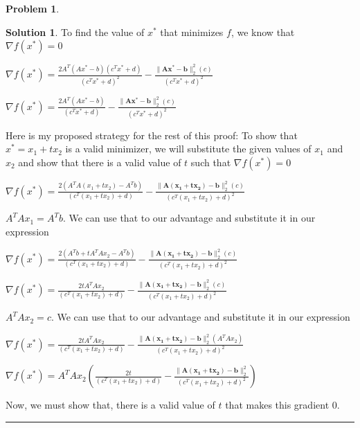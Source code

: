 \documentclass{article}
\theoremstyle{definition}
\newtheorem{problem}{Problem}
\def\fline{\rule{0.75\linewidth}{0.5pt}}
\newcommand{\finishline}{\begin{center}\fline\end{center}}
\newtheorem*{solution*}{Solution}
\newenvironment{solution}{\begin{solution*}}{{\finishline} \end{solution*}}
\begin{document}
\begin{problem}
\begin{enumerate}
    \begin{solution}
    To find the value of $x^*$ that minimizes $f$, we know that $\nabla f(x^*) = 0$ \newline 

        $\nabla f(x^*) = \frac{2A^T (Ax^* - b)(c^Tx^* + d)}{(c^Tx^* + d) ^ 2} - \frac{\|\mathbf{Ax^* - b}\|^2_2 (c)}{(c^Tx^* + d) ^ 2}$ \newline 

        $\nabla f(x^*) = \frac{2A^T (Ax^* - b)}{(c^Tx^* + d)} - \frac{\|\mathbf{Ax^* - b}\|^2_2 (c)}{(c^Tx^* + d) ^ 2}$ \newline 


        Here is my proposed strategy for the rest of this proof: \newline 
        To show that $x^* = x_1 + tx_2$ is a valid minimizer, we will substitute the given values of $x_1$ and $x_2$ and show that there is a valid value of $t$ such that $\nabla f(x^*) = 0$ \newline 

        $\nabla f(x^*) = \frac{2(A^TA(x_1 + tx_2) - A^Tb)}{(c^T(x_1 + tx_2) + d)} - \frac{\|\mathbf{A(x_1 + tx_2) - b}\|^2_2 (c)}{(c^T(x_1 + tx_2) + d) ^ 2}$ \newline 

        $A^TAx_1 = A^Tb$. We can use that to our advantage and substitute it in our expression

        $\nabla f(x^*) = \frac{2(A^Tb + tA^TAx_2 - A^Tb)}{(c^T(x_1 + tx_2) + d)} - \frac{\|\mathbf{A(x_1 + tx_2) - b}\|^2_2 (c)}{(c^T(x_1 + tx_2) + d) ^ 2}$ \newline 

        $\nabla f(x^*) = \frac{2tA^TAx_2}{(c^T(x_1 + tx_2) + d)} - \frac{\|\mathbf{A(x_1 + tx_2) - b}\|^2_2 (c)}{(c^T(x_1 + tx_2) + d) ^ 2}$ \newline 

        $A^TAx_2 = c$. We can use that to our advantage and substitute it in our expression \newline 

        $\nabla f(x^*) = \frac{2tA^TAx_2}{(c^T(x_1 + tx_2) + d)} - \frac{\|\mathbf{A(x_1 + tx_2) - b}\|^2_2 (A^TAx_2)}{(c^T(x_1 + tx_2) + d) ^ 2}$ \newline 

        $\nabla f(x^*) = A^TAx_2 (\frac{2t}{(c^T(x_1 + tx_2) + d)} - \frac{\|\mathbf{A(x_1 + tx_2) - b}\|^2_2}{(c^T(x_1 + tx_2) + d) ^ 2})$ \newline 


        Now, we must show that, there is a valid value of $t$ that makes this gradient 0. \newline 


\end{solution}
\end{enumerate}
\end{problem}
\end{document}
